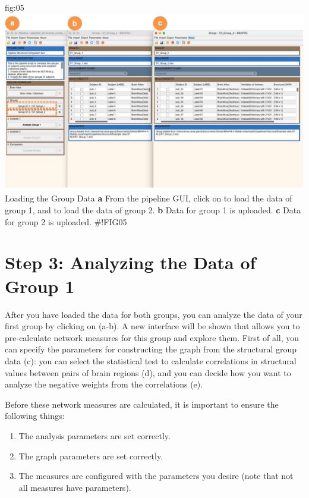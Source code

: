 \documentclass[justified]{tufte-handout}
\begin{document}
{fig:05}
{\includegraphics{fig05.jpg}
}
{Loading the Group Data}
{
	{\bf a} From the pipeline GUI, click on  to load the data of group 1, and  to load the data of group 2.
	{\bf b} Data for group 1 is uploaded. {\bf c} Data for group 2 is uploaded.
}
#!FIG05

\section{Step 3: Analyzing the Data of Group 1}
 
After you have loaded the data for both groups, you can analyze the data of your first group by clicking on  (a-b). A new interface will be shown that allows you to pre-calculate network measures for this group and explore them. First of all, you can specify the parameters for constructing the graph from the structural group data (c): you can select the statistical test to calculate correlations in structural values between pairs of brain regions (d), and you can decide how you want to analyze the negative weights from the correlations (e). 

Before these network measures are calculated, it is important to ensure the following things: 
\begin{enumerate}
	\item The analysis parameters are set correctly.
	\item The graph parameters are set correctly.
	\item The measures are configured with the parameters you desire (note that not all measures have parameters).
\end{enumerate}
\end{document}
